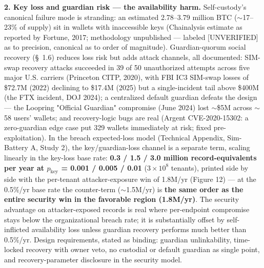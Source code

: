 \documentclass[11pt,twocolumn]{article}
\begin{document}
\textbf{2. Key loss and guardian risk --- the availability harm.} Self-custody's canonical failure mode is stranding: an estimated 2.78--3.79 million BTC ($\sim$17--23\% of supply) sit in wallets with inaccessible keys (Chainalysis estimate as reported by Fortune, 2017; methodology unpublished --- labeled [UNVERIFIED] as to precision, canonical as to order of magnitude). Guardian-quorum social recovery (\S~1.6) reduces loss risk but adds attack channels, all documented: SIM-swap recovery attacks succeeded in 39 of 50 unauthorized attempts across five major U.S. carriers (Princeton CITP, 2020), with FBI IC3 SIM-swap losses of \$72.7M (2022) declining to \$17.4M (2025) but a single-incident tail above \$400M (the FTX incident, DOJ 2024); a centralized default guardian defeats the design --- the Loopring "Official Guardian" compromise (June 2024) lost $\sim$\$5M across $\sim$58 users' wallets; and recovery-logic bugs are real (Argent CVE-2020-15302: a zero-guardian edge case put 329 wallets immediately at risk; fixed pre-exploitation). In the breach expected-loss model (Technical Appendix, Sim-Battery A, Study 2), the key/guardian-loss channel is a separate term, scaling linearly in the key-loss base rate: \textbf{0.3 / 1.5 / 3.0 million record-equivalents per year at $p_{\mathrm{key}}$ = 0.001 / 0.005 / 0.01} ($3\times 10^{8}$ tenants), printed side by side with the per-tenant attacker-exposure win of 1.8M/yr (Figure 12) --- at the 0.5\%/yr base rate the counter-term ($\sim$1.5M/yr) is \textbf{the same order as the entire security win in the favorable region (1.8M/yr)}. The security advantage on attacker-exposed records is real where per-endpoint compromise stays below the organizational breach rate; it is substantially offset by self-inflicted availability loss unless guardian recovery performs much better than 0.5\%/yr. Design requirements, stated as binding: guardian unlinkability, time-locked recovery with owner veto, no custodial or default guardian as single point, and recovery-parameter disclosure in the security model.
\end{document}
